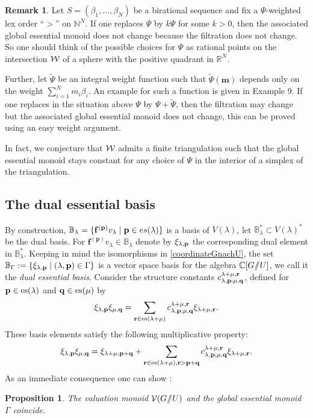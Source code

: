 \documentclass{emsprocart}
\newtheorem{proposition}[theorem]{Proposition}
\theoremstyle{definition}
\newtheorem{remark}[theorem]{Remark}
\begin{document}
\begin{remark}\label{changepsi}
Let $S=(\beta_1,\ldots,\beta_N)$ be a birational sequence and fix a $\Psi$-weighted lex order ``$>$''
on $\mathbb N^N$. If one replaces $\Psi$ by $k\Psi$ for some $k>0$, then the
associated global essential monoid does not change because the filtration
does not change. So one should think of the possible choices for $\Psi$
as rational points on the intersection $\cal W$ of a sphere with the positive quadrant
in $\mathbb R^N$.

Further, let $\tilde \Psi$ be an integral weight function such that  $\tilde \Psi(\mathbf m)$
depends only on the weight $\sum_{i=1}^N m_i\beta_i$. An example for such a function
is given in Example 9. If one replaces in the situation above
$\Psi$ by $\Psi +\tilde\Psi$, then the filtration may change but the associated
global essential monoid does not change, this can be proved using an easy weight argument.

In fact, we conjecture that $\cal W$ admits a finite triangulation such that the global essential monoid
stays constant for any choice of $\Psi$ in the interior of a simplex of the triangulation.
\end{remark}


\subsection{The dual essential basis}\label{gammagleichnu}
By construction,  $\mathbb B_\lambda=\{\mathbf f^{(\mathbf p)}
v_\lambda \mid {\bf p} \in es(\lambda) \}$ is a basis of $V(\lambda)$, let $\mathbb B_\lambda^*\subset V(\lambda)^*$
be the dual basis. For $\mathbf f^{(\mathbf p)}v_\lambda\in \mathbb B_\lambda$ denote by $\xi_{\lambda,\bf p}$ the corresponding dual element in $\mathbb B_\lambda^*$.
Keeping in mind the isomorphisms in \eqref{coordinateGnachU}, the set
$\mathbb B_\Gamma:=\{\xi_{\lambda,\bf p}\mid (\lambda,{\bf p})\in \Gamma\}$
is a vector space basis for the algebra $\mathbb C[G/\hskip -3.5pt/U]$, we call it the {\it dual essential basis}.
Consider the structure constants $c_{\lambda,{\bf p};\mu,\mathbf q}^{\lambda+\mu,\mathbf r}$, defined for $\mathbf p\in {\rm es}(\lambda)$ and
$\mathbf q\in {\rm es}(\mu)$ by
\[
\xi_{\lambda,\mathbf p}\xi_{\mu,\mathbf q}=\sum_{\mathbf r\in {\rm es}(\lambda+\mu)} c_{\lambda,\mathbf p;\mu,\mathbf q}^{\lambda+\mu,\mathbf r}
\xi_{\lambda+\mu,\mathbf r}.
\]
These basis elements satisfy the following multiplicative property:
$$\xi_{\lambda,\mathbf p}\xi_{\mu,\mathbf q}= \xi_{\lambda+\mu,\mathbf p+\mathbf q} + \sum_{\mathbf r\in {\rm es}(\lambda+\mu),\mathbf r >\mathbf p+\mathbf q}
c_{\lambda,\mathbf p;\mu,\mathbf q}^{\lambda+\mu,\mathbf r}\xi_{\lambda+\mu,\mathbf r}.$$
As an immediate consequence one can show \cite{FaFL}:
\begin{proposition}\label{semigleichsemi1}\it
The valuation {monoid} ${\cal V}(G/\hskip -3.5pt/U)$ and the global essential monoid $\Gamma$ coincide.
\end{proposition}
\end{document}
